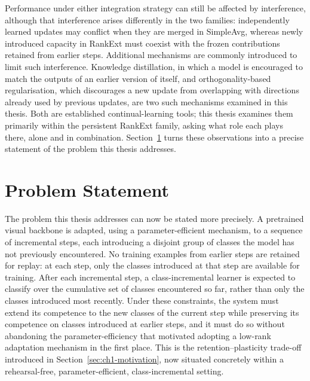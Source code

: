 Performance under either integration strategy can still be affected by
interference, although that interference arises differently in the two
families: independently learned updates may conflict when they are merged
in SimpleAvg, whereas newly introduced capacity in RankExt must coexist
with the frozen contributions retained from earlier steps. Additional
mechanisms are commonly introduced to limit such interference. Knowledge
distillation, in which a model is encouraged to match the outputs of an
earlier version of itself, and orthogonality-based regularisation, which
discourages a new update from overlapping with directions already used by
previous updates, are two such mechanisms examined in this thesis. Both are
established continual-learning tools; this thesis examines them primarily
within the persistent RankExt family, asking what role each plays there,
alone and in combination.
Section~\ref{sec:ch1-problem-statement} turns these observations into a
precise statement of the problem this thesis addresses.

\section{Problem Statement}
\label{sec:ch1-problem-statement}

The problem this thesis addresses can now be stated more precisely. A
pretrained visual backbone is adapted, using a parameter-efficient
mechanism, to a sequence of incremental steps, each introducing a disjoint
group of classes the model has not previously encountered. No training
examples from earlier steps are retained for replay: at each step, only
the classes introduced at that step are available for training. After
each incremental step, a class-incremental learner is expected to classify
over the cumulative set of classes encountered so far, rather than only the
classes introduced most recently. Under these constraints, the system must extend its competence to the new
classes of the current step while preserving its competence on classes
introduced at earlier steps, and it must do so without abandoning the
parameter-efficiency that motivated adopting a low-rank adaptation
mechanism in the first place. This is the retention--plasticity trade-off
introduced in Section~\ref{sec:ch1-motivation}, now situated concretely
within a rehearsal-free, parameter-efficient, class-incremental setting.

